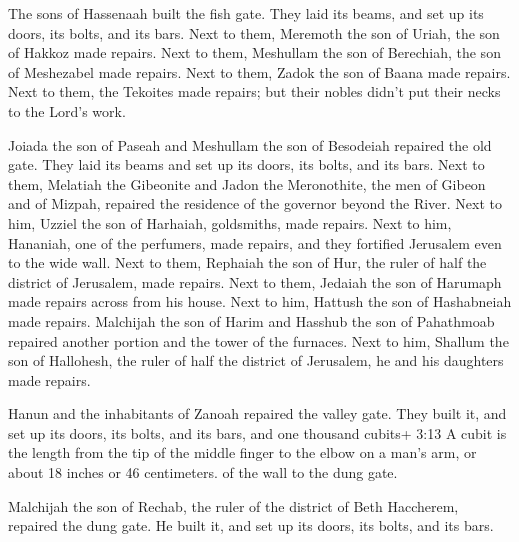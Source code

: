  The sons of Hassenaah built the fish gate. They laid its
beams, and set up its doors, its bolts, and its bars.  Next
to them, Meremoth the son of Uriah, the son of Hakkoz made repairs. Next
to them, Meshullam the son of Berechiah, the son of Meshezabel made
repairs. Next to them, Zadok the son of Baana made repairs. 
Next to them, the Tekoites made repairs; but their nobles didn't put
their necks to the Lord's work.

 Joiada the son of Paseah and Meshullam the son of Besodeiah
repaired the old gate. They laid its beams and set up its doors, its
bolts, and its bars.  Next to them, Melatiah the Gibeonite
and Jadon the Meronothite, the men of Gibeon and of Mizpah, repaired the
residence of the governor beyond the River.  Next to him,
Uzziel the son of Harhaiah, goldsmiths, made repairs. Next to him,
Hananiah, one of the perfumers, made repairs, and they fortified
Jerusalem even to the wide wall.  Next to them, Rephaiah the
son of Hur, the ruler of half the district of Jerusalem, made repairs.
 Next to them, Jedaiah the son of Harumaph made repairs
across from his house. Next to him, Hattush the son of Hashabneiah made
repairs.  Malchijah the son of Harim and Hasshub the son of
Pahathmoab repaired another portion and the tower of the furnaces.
 Next to him, Shallum the son of Hallohesh, the ruler of
half the district of Jerusalem, he and his daughters made repairs.

 Hanun and the inhabitants of Zanoah repaired the valley
gate. They built it, and set up its doors, its bolts, and its bars, and
one thousand cubits+ 3:13 A cubit is the length from the tip of the
middle finger to the elbow on a man's arm, or about 18 inches or 46
centimeters. of the wall to the dung gate.

 Malchijah the son of Rechab, the ruler of the district of
Beth Haccherem, repaired the dung gate. He built it, and set up its
doors, its bolts, and its bars.

